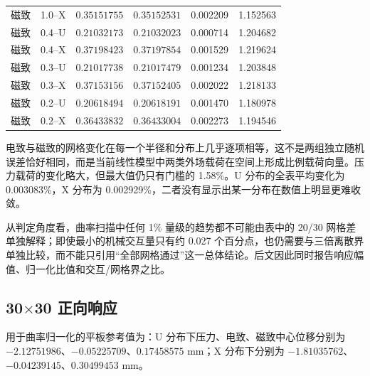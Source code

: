 \documentclass[UTF8,fontset=windows,11pt,a4paper]{ctexart}
\begin{document}
{\begin{longtable}{llrrrr}
磁致 & 1.0--X & $0.35151755$ & $0.35152531$ & 0.002209 & 1.152563 \\
磁致 & 0.4--U & $0.21032173$ & $0.21032023$ & 0.000714 & 1.204682 \\
磁致 & 0.4--X & $0.37198423$ & $0.37197854$ & 0.001529 & 1.219624 \\
磁致 & 0.3--U & $0.21017738$ & $0.21017479$ & 0.001234 & 1.203848 \\
磁致 & 0.3--X & $0.37153156$ & $0.37152405$ & 0.002022 & 1.218133 \\
磁致 & 0.2--U & $0.20618494$ & $0.20618191$ & 0.001470 & 1.180978 \\
磁致 & 0.2--X & $0.36433832$ & $0.36433004$ & 0.002273 & 1.194546 \\
\end{longtable}
}

电致与磁致的网格变化在每一个半径和分布上几乎逐项相等，这不是两组独立随机误差恰好相同，而是当前线性模型中两类外场载荷在空间上形成比例载荷向量。压力载荷的变化略大，但最大值仍只有门槛的 1.58\%。U 分布的全表平均变化为 0.003083\%，X 分布为 0.002929\%，二者没有显示出某一分布在数值上明显更难收敛。

从判定角度看，曲率扫描中任何 1\% 量级的趋势都不可能由表中的 20/30 网格差单独解释；即使最小的机械交互量只有约 0.027 个百分点，也仍需要与三倍离散界单独比较，而不能只引用“全部网格通过”这一总体结论。后文因此同时报告响应幅值、归一化比值和交互/网格界之比。

\subsection{\texorpdfstring{30$\times$30 正向响应}{30x30 正向响应}}

用于曲率归一化的平板参考值为：U 分布下压力、电致、磁致中心位移分别为 $-2.12751986$、$-0.05225709$、$0.17458575$ mm；X 分布下分别为 $-1.81035762$、$-0.04239145$、$0.30499453$ mm。
\end{document}

